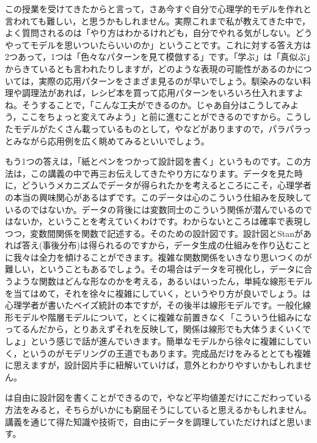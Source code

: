 \documentclass{ltjsbook}
\begin{document}
この授業を受けてきたからと言って，さあ今すぐ自分で心理学的モデルを作れと言われても難しい，と思うかもしれません。実際これまで私が教えてきた中で，よく質問されるのは「やり方はわかるけれども，自分でやれる気がしない。どうやってモデルを思いついたらいいのか」ということです。これに対する答え方は2つあって，1つは「色々なパターンを見て模倣する」です。「学ぶ」は「真似ぶ」からきているとも言われたりしますが，どのような表現の可能性があるのかについては，実際の応用パターンをさまざま見るのが早いでしょう。馴染みのない料理や調理法があれば，レシピ本を買って応用パターンをいろいろ仕入れますよね。そうすることで，「こんな工夫ができるのか。じゃあ自分はこうしてみよう，ここをちょっと変えてみよう」と前に進むことができるのですから。こうしたモデルがたくさん載っているものとして，\citet{Lee201709}や\citet{豊田秀樹2017,豊田秀樹2018,豊田秀樹2019}などがありますので，パラパラっとみながら応用例を広く眺めてみるといいでしょう。

もう1つの答えは，「紙とペンをつかって設計図を書く」というものです。この方法は，この講義の中で再三お伝えしてきたやり方になります。データを見た時に，どういうメカニズムでデータが得られたかを考えるところにこそ，心理学者の本当の興味関心があるはずです。このデータは心のこういう仕組みを反映しているのではないか。データの背後には変数同士のこういう関係が潜んでいるのではないか，ということを考えていくわけです。わからないところは確率で表現しつつ，変数間関係を関数で記述する。そのための設計図です。設計図とStanがあれば答え(事後分布)は得られるのですから，データ生成の仕組みを作り込むことに我々は全力を傾けることができます。複雑な関数関係をいきなり思いつくのが難しい，ということもあるでしょう。その場合はデータを可視化し，データに合うような関数はどんな形なのかを考える，あるいはいったん，単純な線形モデルを当てはめて，それを徐々に複雑にしていく，というやり方が良いでしょう。\citet{Maeda2017}は心理学者が書いたベイズ統計の本ですが，その後半は線形モデルです。一般化線形モデルや階層モデルについて，とくに複雑な前置きなく「こういう仕組みになってるんだから，とりあえずそれを反映して，関係は線形でも大体うまくいくでしょ」という感じで話が進んでいきます。簡単なモデルから徐々に複雑にしていく，というのがモデリングの王道でもあります。完成品だけをみるととても複雑に思えますが，設計図片手に紐解いていけば，意外とわかりやすいかもしれません。

は自由に設計図を書くことができるので，やなど平均値差だけにこだわっている方法をみると，そちらがいかにも窮屈そうにしていると思えるかもしれません。講義を通じて得た知識や技術で，自由にデータを調理していただければと思います。
\end{document}
